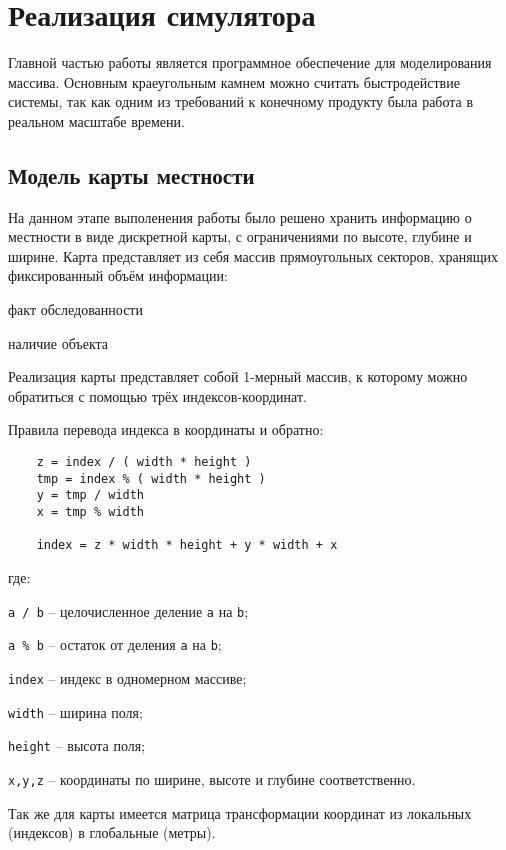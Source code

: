 \newpage
\section{Реализация симулятора}

Главной частью работы является программное обеспечение для моделирования
массива. Основным краеугольным камнем можно считать быстродействие системы, 
так как одним из требований к конечному продукту была работа в реальном масштабе
времени.

\newpage
\subsection{Модель карты местности}

На данном этапе выполенения работы было решено хранить информацию о местности в
виде дискретной карты, с ограничениями по высоте, глубине и ширине. Карта
представляет из себя массив прямоугольных секторов, хранящих фиксированный объём
информации:
\begin{mintemize}
    \item факт обследованности
    \item наличие объекта
\end{mintemize}

Реализация карты представляет собой 1-мерный массив, к которому можно обратиться с помощью трёх
индексов-координат.

Правила перевода индекса в координаты и обратно:

\begin{verbatim}
    z = index / ( width * height )
    tmp = index % ( width * height )
    y = tmp / width
    x = tmp % width

    index = z * width * height + y * width + x
\end{verbatim}
\vspace{-0.5em}

где:

\verb|a / b| -- целочисленное деление \verb|a| на \verb|b|;

\verb|a % b| -- остаток от деления \verb|a| на \verb|b|;

\verb|index| -- индекс в одномерном массиве;

\verb|width| -- ширина поля;

\verb|height| -- высота поля;

\verb|x,y,z| -- координаты по ширине, высоте и глубине соответственно.

Так же для карты имеется матрица трансформации координат из локальных (индексов)
в глобальные (метры).

